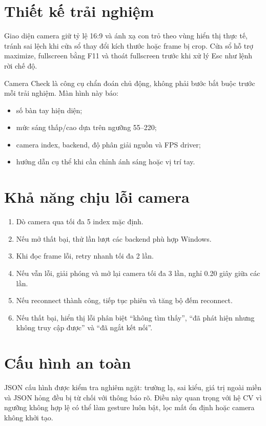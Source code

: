 \documentclass[12pt,a4paper,oneside]{report}
\begin{document}
\section{Thiết kế trải nghiệm}

Giao diện camera giữ tỷ lệ 16:9 và ánh xạ con trỏ theo vùng hiển thị thực tế, tránh sai lệch khi cửa sổ thay đổi kích thước hoặc frame bị crop. Cửa sổ hỗ trợ maximize, fullscreen bằng F11 và thoát fullscreen trước khi xử lý Esc như lệnh rời chế độ.

Camera Check là công cụ chẩn đoán chủ động, không phải bước bắt buộc trước mỗi trải nghiệm. Màn hình này báo:

\begin{itemize}
  \item số bàn tay hiện diện;
  \item mức sáng thấp/cao dựa trên ngưỡng 55--220;
  \item camera index, backend, độ phân giải nguồn và FPS driver;
  \item hướng dẫn cụ thể khi cần chỉnh ánh sáng hoặc vị trí tay.
\end{itemize}

\section{Khả năng chịu lỗi camera}

\begin{enumerate}
  \item Dò camera qua tối đa 5 index mặc định.
  \item Nếu mở thất bại, thử lần lượt các backend phù hợp Windows.
  \item Khi đọc frame lỗi, retry nhanh tối đa 2 lần.
  \item Nếu vẫn lỗi, giải phóng và mở lại camera tối đa 3 lần, nghỉ 0.20 giây giữa các lần.
  \item Nếu reconnect thành công, tiếp tục phiên và tăng bộ đếm reconnect.
  \item Nếu thất bại, hiển thị lỗi phân biệt ``không tìm thấy'', ``đã phát hiện nhưng không truy cập được'' và ``đã ngắt kết nối''.
\end{enumerate}

\section{Cấu hình an toàn}

JSON cấu hình được kiểm tra nghiêm ngặt: trường lạ, sai kiểu, giá trị ngoài miền và JSON hỏng đều bị từ chối với thông báo rõ. Điều này quan trọng với hệ CV vì ngưỡng không hợp lệ có thể làm gesture luôn bật, lọc mất ổn định hoặc camera không khởi tạo.
\end{document}
